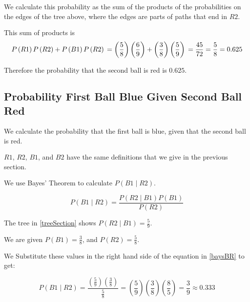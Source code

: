 \documentclass[a4paper,11pt]{article}
\begin{document}
We calculate this probability as the sum of the products of the
probabilities on the edges of the tree above, where the edges
are parts of paths that end in $R2$.

This sum of products is
\begin{equation}
  P \left( R1 \right) P\left( R2 \right) + 
    P \left( B1 \right) P \left( R2 \right) \\
   = \left( \frac{5}{8} \right)  \left( \frac{6}{9} \right) 
    + \left( \frac{3}{8} \right) \left( \frac{5}{9} \right) \\
  = \frac{45}{72} = \frac{5}{8} = 0.625
\end{equation}

Therefore the probability that the second ball is red is $0.625$.

\subsection{Probability First Ball Blue Given Second Ball Red}

We calculate the probability that the first ball is blue, given that
the second ball is red.

$R1$, $R2$, $B1$, and $B2$ have the same definitions that
we give in the previous section.

We use Bayes' Theorem \cite{reading3} to calculate
$P \left( B1 \mid R2 \right)$.

\begin{equation} \label{baysBR}
  P \left( B1 \mid R2 \right) = 
    \frac{ P \left( R2 \mid B1 \right) P\left( B1 \right) } 
      { P \left( R2 \right) }
\end{equation}

The tree in \ref{treeSection} shows 
$P\left( R2 \mid B1 \right) = \frac{5}{9}$.

We are given $P \left( B1 \right) = \frac{3}{8}$, and
$P \left( R2 \right) = \frac{5}{8}$.

We Substitute these values in the right hand side of the 
equation in \ref{baysBR} to get:

\begin{equation}
  P \left( B1 \mid R2 \right) 
  = \frac { \left( \frac{5}{9} \right) \left( \frac{3}{8} \right) }
      {\frac{5}{8}}
  = \left( \frac{5}{9} \right) \left( \frac{3}{8} \right) 
    \left( \frac{8}{5} \right) 
  = \frac{3}{9} \approx 0.333
\end{equation}


\printbibliography{}
\end{document}
